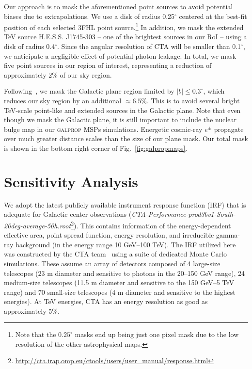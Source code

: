 \documentclass[doublespace,nopageskip]{VTthesis}
\begin{document}
Our approach is to mask the aforementioned point sources to avoid potential biases due to extrapolations. We use a disk of radius 0.25$^\circ$ centered at the best-fit position of each selected 3FHL point source.\footnote{Note that the $0.25^\circ$ masks end up being just one pixel mask due to the low resolution of the other astrophysical maps.} 
In addition, we mask the extended TeV source H.E.S.S. J1745-303 -- one of the brightest sources in our RoI --
using a disk of radius 0.4$^\circ$. Since the angular resolution of CTA will be smaller than 0.1$^\circ$, we anticipate a negligible effect of potential photon leakage. 
In total, we mask five point sources in our region of interest, representing a reduction of approximately $2\%$ of our sky region.

Following~\cite{2021PhRvD.103b3011R}, we mask the Galactic plane region limited by $\lvert b \rvert \leq 0.3^\circ$, which reduces our sky region by an additional $\approx 6.5\%$. This is to avoid several bright TeV-scale point-like and extended sources in the Galactic plane. Note that even though we mask the Galactic plane, it is still important to include the nuclear bulge map in our \textsc{galprop} MSPs simulations. Energetic cosmic-ray $e^{\pm}$ propagate over much greater distance scales than the size of our plane mask. Our total mask is shown in the bottom right corner of Fig.~\ref{fig:galpropmaps}.

\section{Sensitivity Analysis}
\label{sec:sensitivity}

We adopt the latest publicly available instrument response function (IRF) that is adequate for Galactic center observations (\textit{CTA-Performance-prod3bv1-South-20deg-average-50h.root}\footnote{\url{http://cta.irap.omp.eu/ctools/users/user_manual/response.html}}). This contains information of the energy-dependent effective area, point spread function, energy resolution, and irreducible gamma-ray background (in the energy range 10 GeV--100 TeV). The IRF utilized here was constructed by the CTA team~\citep{2015ICRC...34..971H} using a suite of dedicated Monte Carlo simulations. These assume an array of detectors composed of 4 large-size telescopes (23 m diameter and sensitive to photons in the 20--150 GeV range),  24 medium-size telescopes (11.5 m diameter and sensitive to the 150 GeV--5 TeV range) and 70 small-size telescopes (4 m diameter and sensitive to the highest energies). At TeV energies, CTA has an energy resolution as good as approximately 5\%.
\end{document}
